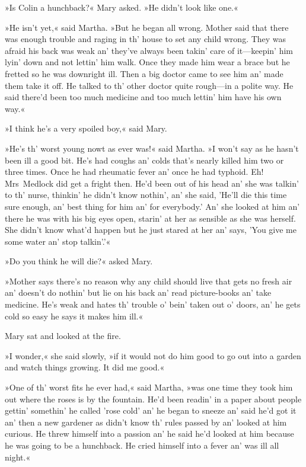 »Is Colin a hunchback?« Mary asked. »He didn't look like one.«

»He isn't yet,« said Martha. »But he began all wrong. Mother said that there was enough trouble and raging in th' house to set any child wrong. They was afraid his back was weak an' they've always been takin' care of it—keepin' him lyin' down and not lettin' him walk. Once they made him wear a brace but he fretted so he was downright ill. Then a big doctor came to see him an' made them take it off. He talked to th' other doctor quite rough—in a polite way. He said there'd been too much medicine and too much lettin' him have his own way.«

»I think he's a very spoiled boy,« said Mary.

»He's th' worst young nowt as ever was!« said Martha. »I won't say as he hasn't been ill a good bit. He's had coughs an' colds that's nearly killed him two or three times. Once he had rheumatic fever an' once he had typhoid. Eh! Mrs~Medlock did get a fright then. He'd been out of his head an' she was talkin' to th' nurse, thinkin' he didn't know nothin', an' she said, 'He'll die this time sure enough, an' best thing for him an' for everybody.' An' she looked at him an' there he was with his big eyes open, starin' at her as sensible as she was herself. She didn't know what'd happen but he just stared at her an' says, 'You give me some water an' stop talkin'.'«

»Do you think he will die?« asked Mary.

»Mother says there's no reason why any child should live that gets no fresh air an' doesn't do nothin' but lie on his back an' read picture-books an' take medicine. He's weak and hates th' trouble o' bein' taken out o' doors, an' he gets cold so easy he says it makes him ill.«

Mary sat and looked at the fire.

»I wonder,« she said slowly, »if it would not do him good to go out into a garden and watch things growing. It did me good.«

»One of th' worst fits he ever had,« said Martha, »was one time they took him out where the roses is by the fountain. He'd been readin' in a paper about people gettin' somethin' he called 'rose cold' an' he began to sneeze an' said he'd got it an' then a new gardener as didn't know th' rules passed by an' looked at him curious. He threw himself into a passion an' he said he'd looked at him because he was going to be a hunchback. He cried himself into a fever an' was ill all night.«

